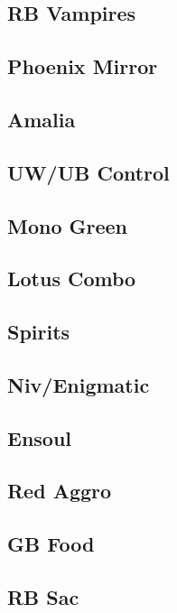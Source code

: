 \documentclass[12pt]{article}
\begin{document}
\subsection{RB Vampires}

\subsection{Phoenix Mirror}

\subsection{Amalia}

\subsection{UW/UB Control}

\subsection{Mono Green}

\subsection{Lotus Combo}

\subsection{Spirits}

\subsection{Niv/Enigmatic}

\subsection{Ensoul}

\subsection{Red Aggro}

\subsection{GB Food}

\subsection{RB Sac}
\end{document}
